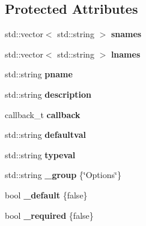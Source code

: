 \subsection*{Protected Attributes}
\begin{DoxyCompactItemize}
\item 
\mbox{\label{class_c_l_i_1_1_option_ac28157805c3d7e13dc5636d01c3d4913}} 
std\+::vector$<$ std\+::string $>$ {\bfseries snames}
\item 
\mbox{\label{class_c_l_i_1_1_option_a93808c6deea5e76a285122d97411fb21}} 
std\+::vector$<$ std\+::string $>$ {\bfseries lnames}
\item 
\mbox{\label{class_c_l_i_1_1_option_add0264f8eb6029868704f9127b1d5dde}} 
std\+::string {\bfseries pname}
\item 
\mbox{\label{class_c_l_i_1_1_option_a09ff254da5e446741cc1267fd988fc12}} 
std\+::string {\bfseries description}
\item 
\mbox{\label{class_c_l_i_1_1_option_ad7e58b3981990eca42fc3c5631157d64}} 
callback\+\_\+t {\bfseries callback}
\item 
\mbox{\label{class_c_l_i_1_1_option_a8ceb8093d3379a4570bf022119e6cc00}} 
std\+::string {\bfseries defaultval}
\item 
\mbox{\label{class_c_l_i_1_1_option_afeef9734a60b2f0f244ba06ac6add35d}} 
std\+::string {\bfseries typeval}
\item 
\mbox{\label{class_c_l_i_1_1_option_ab9ac4458f54b5f815cb6e33b9b8b3e79}} 
std\+::string {\bfseries \+\_\+group} \{\char`\"{}Options\char`\"{}\}
\item 
\mbox{\label{class_c_l_i_1_1_option_a8f9325c2b17a30159d1fb7499655f7fd}} 
bool {\bfseries \+\_\+default} \{false\}
\item 
\mbox{\label{class_c_l_i_1_1_option_a0223f2dffff5cabced014d33157d417f}} 
bool {\bfseries \+\_\+required} \{false\}

\end{DoxyCompactItemize}
